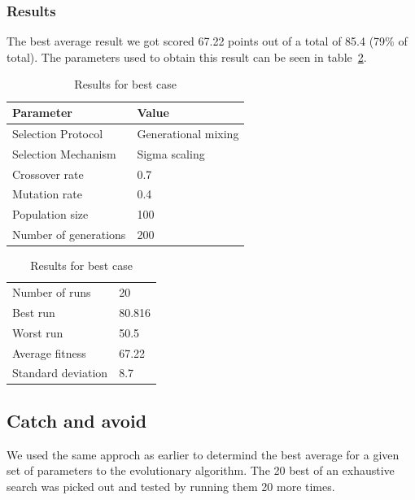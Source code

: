 \documentclass[12pt]{article}
\begin{document}
		\subsubsection{Results}
			The best average result we got scored 67.22 points out of a total of 85.4 (79\% of total). 
			The parameters used to obtain this result can be seen in table~\ref{tab:resultAll}. 
			\begin{table}[h]
				\parbox{.45\linewidth}{
					\centering
					\begin{tabular}{ll}
						Parameter & Value\\\hline
						Selection Protocol & Generational mixing\\
						Selection Mechanism & Sigma scaling\\
						Crossover rate & 0.7\\
						Mutation rate & 0.4\\
						Population size & 100\\
						Number of generations & 200
					\end{tabular}
					\caption{Parameters used to obtain best average case}
					\label{tab:resultAll}
				}
				\hfill
				\parbox{.45\linewidth}{
					\centering
					\begin{tabular}{ll}
						Number of runs & 20 \\
						Best run & 80.816\\
						Worst run & 50.5\\
						\hline
						Average fitness & 67.22\\
						Standard deviation & 8.7\\
					\end{tabular}
					\caption{Results for best case}
					\label{tab:resultAll}
				}
			\end{table}
	\subsection{Catch and avoid}
		We used the same approch as earlier to determind the best average for a given set of parameters to the evolutionary algorithm. The 20 best of an exhaustive search was picked out and tested by running them 20 more times. 
\end{document}
